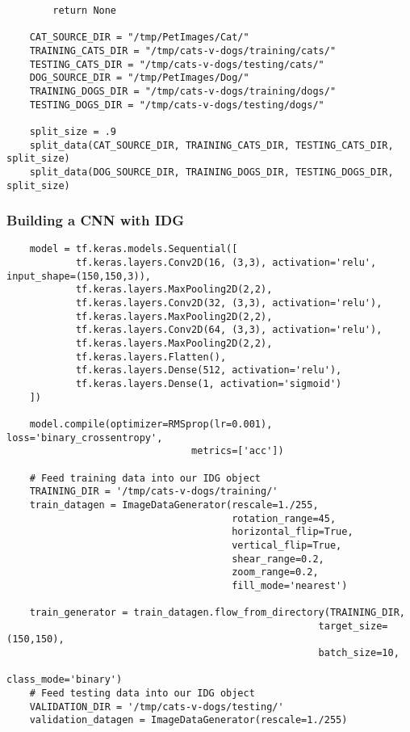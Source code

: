 \documentclass[11pt, a4paper]{article}
\begin{document}
\begin{spacing}{1.1}
\begin{lstlisting}
		return None
	
	CAT_SOURCE_DIR = "/tmp/PetImages/Cat/"
	TRAINING_CATS_DIR = "/tmp/cats-v-dogs/training/cats/"
	TESTING_CATS_DIR = "/tmp/cats-v-dogs/testing/cats/"
	DOG_SOURCE_DIR = "/tmp/PetImages/Dog/"
	TRAINING_DOGS_DIR = "/tmp/cats-v-dogs/training/dogs/"
	TESTING_DOGS_DIR = "/tmp/cats-v-dogs/testing/dogs/"
	
	split_size = .9
	split_data(CAT_SOURCE_DIR, TRAINING_CATS_DIR, TESTING_CATS_DIR, split_size)
	split_data(DOG_SOURCE_DIR, TRAINING_DOGS_DIR, TESTING_DOGS_DIR, split_size) \end{lstlisting} \newpage

	\subsubsection{Building a CNN with IDG}
	\begin{lstlisting}
	model = tf.keras.models.Sequential([
			tf.keras.layers.Conv2D(16, (3,3), activation='relu', input_shape=(150,150,3)),
			tf.keras.layers.MaxPooling2D(2,2),
			tf.keras.layers.Conv2D(32, (3,3), activation='relu'),
			tf.keras.layers.MaxPooling2D(2,2),
			tf.keras.layers.Conv2D(64, (3,3), activation='relu'),
			tf.keras.layers.MaxPooling2D(2,2),
			tf.keras.layers.Flatten(),
			tf.keras.layers.Dense(512, activation='relu'),
			tf.keras.layers.Dense(1, activation='sigmoid')
	])
	
	model.compile(optimizer=RMSprop(lr=0.001), loss='binary_crossentropy', 
								metrics=['acc'])
	
	# Feed training data into our IDG object
	TRAINING_DIR = '/tmp/cats-v-dogs/training/'
	train_datagen = ImageDataGenerator(rescale=1./255,
	                                   rotation_range=45,
	                                   horizontal_flip=True,
	                                   vertical_flip=True,
	                                   shear_range=0.2,
	                                   zoom_range=0.2,
	                                   fill_mode='nearest')
	
	train_generator = train_datagen.flow_from_directory(TRAINING_DIR,
                                                      target_size=(150,150),
                                                      batch_size=10,
                                                      class_mode='binary')
	# Feed testing data into our IDG object
	VALIDATION_DIR = '/tmp/cats-v-dogs/testing/'
	validation_datagen = ImageDataGenerator(rescale=1./255)
	

\end{lstlisting}
\end{spacing}
\end{document}
